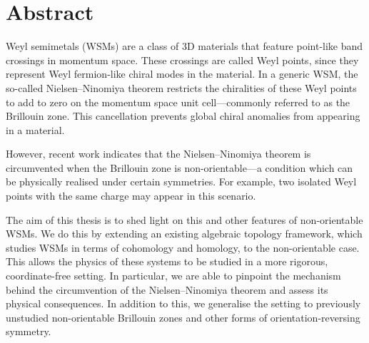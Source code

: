 \chapter*{Abstract}

Weyl semimetals (WSMs) are a class of 3D materials that feature point-like band crossings in momentum space. These crossings are called Weyl points, since they represent Weyl fermion-like chiral modes in the material. In a generic WSM, the so-called Nielsen–Ninomiya theorem restricts the chiralities of these Weyl points to add to zero on the momentum space unit cell—commonly referred to as the Brillouin zone. This cancellation prevents global chiral anomalies from appearing in a material.

However, recent work indicates that the Nielsen–Ninomiya theorem is circumvented when the Brillouin zone is non-orientable—a condition which can be physically realised under certain symmetries. For example, two isolated Weyl points with the same charge may appear in this scenario.

The aim of this thesis is to shed light on this and other features of non-orientable WSMs. We do this by extending an existing algebraic topology framework, which studies WSMs in terms of cohomology and homology, to the non-orientable case. This allows the physics of these systems to be studied in a more rigorous, coordinate-free setting. In particular, we are able to pinpoint the mechanism behind the circumvention of the Nielsen–Ninomiya theorem and assess its physical consequences. In addition to this, we generalise the setting to previously unstudied non-orientable Brillouin zones and other forms of orientation-reversing symmetry.

